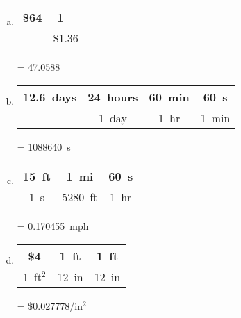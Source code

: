 \documentclass[11pt,letterpaper]{article}
\begin{document}
\sol
\begin{enumerate}[(a)]
\item \phantom{.}
	\begin{table}[!ht]
	\centering
	\begin{tabular}{c|c}
	\$64 & 1 \textsterling\ \\ \hline
	& \$1.36
	\end{tabular}
	= 47.0588 \textsterling
	\end{table}

\item \phantom{.}
	\begin{table}[!ht]
	\centering
	\begin{tabular}{c|c|c|c}
	12.6~days & 24~hours & 60~min & 60~s \\ \hline
	& 1~day & 1~hr & 1~min
	\end{tabular}
	= 1088640~s
	\end{table}

\item \phantom{.}
	\begin{table}[!ht]
	\centering
	\begin{tabular}{c|c|c}
	15~ft & 1~mi & 60~s \\ \hline
	1~s & 5280~ft & 1~hr
	\end{tabular}
	= 0.170455~mph
	\end{table}

\item \phantom{.}
	\begin{table}[!ht]
	\centering
	\begin{tabular}{c|c|c}
	\$4 & 1~ft & 1~ft \\ \hline
	1~ft$^2$ & 12~in & 12~in
	\end{tabular}
	= \$0.027778/in$^2$
	\end{table}
\end{enumerate}
\end{document}
